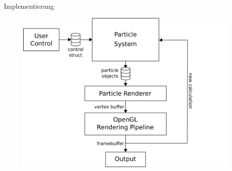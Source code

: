 \documentclass{beamer}
\begin{document}
\begin{frame}
\begin{columns}[T]
\begin{column}{.33\textwidth}
Implementierung\linebreak
\linebreak
\begin{figure}[]
\centering
\includegraphics[width=\textwidth]{../images/system-diagram-no-shaders.pdf}
\end{figure}

\end{column}%
\end{columns}
\end{frame}
\end{document}
